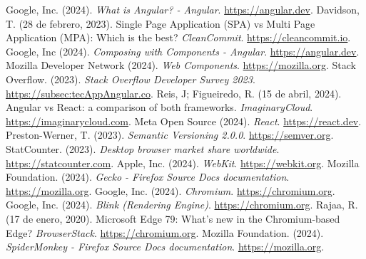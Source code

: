 \begin{thebibliography}{99}
     Google, Inc. (2024). \textit{What is Angular? - Angular}. \href{https://angular.dev/overview}{https://angular.dev}.
     Davidson, T. (28 de febrero, 2023). Single Page Application (SPA) vs Multi Page Application (MPA): Which is the best? \textit{CleanCommit}. \href{https://cleancommit.io/blog/spa-vs-mpa-which-is-the-king}{https://cleancommit.io}.
     Google, Inc (2024). \textit{Composing with Components - Angular}. \href{https://angular.dev/essentials/components}{https://angular.dev}.
     Mozilla Developer Network (2024). \textit{Web Components}. \href{https://developer.mozilla.org/en-US/docs/Web/API/Web_components}{https://mozilla.org}.
     Stack Overflow. (2023). \textit{Stack Overflow Developer Survey 2023}. \href{https://survey.subsec:tecAppAngular.co/2023}{https://subsec:tecAppAngular.co}.
     Reis, J; Figueiredo, R. (15 de abril, 2024). Angular vs React: a comparison of both frameworks. \textit{ImaginaryCloud}. \href{https://www.imaginarycloud.com/blog/angular-vs-react/}{https://imaginarycloud.com}.
     Meta Open Source (2024). \textit{React}. \href{https://react.dev}{https://react.dev}.
     Preston-Werner, T. (2023). \textit{Semantic Versioning 2.0.0}. \href{https://semver.org}{https://semver.org}.
     StatCounter. (2023). \textit{Desktop browser market share worldwide}. \href{https://gs.statcounter.com/browser-market-share/desktop/worldwide/2023}{https://statcounter.com}.
     Apple, Inc. (2024). \textit{WebKit}. \href{https://webkit.org}{https://webkit.org}.
     Mozilla Foundation. (2024). \textit{Gecko - Firefox Source Docs documentation}. \href{https://firefox-source-docs.mozilla.org/overview/gecko.html}{https://mozilla.org}.
     Google, Inc. (2024). \textit{Chromium}. \href{https://www.chromium.org/Home/}{https://chromium.org}.
     Google, Inc. (2024). \textit{Blink (Rendering Engine)}. \href{https://www.chromium.org/blink/}{https://chromium.org}.
     Rajaa, R. (17 de enero, 2020). Microsoft Edge 79: What's new in the Chromium-based Edge? \textit{BrowserStack}. \href{https://www.chromium.org/blink/}{https://chromium.org}.
     Mozilla Foundation. (2024). \textit{SpiderMonkey - Firefox Source Docs documentation}. \href{https://firefox-source-docs.mozilla.org/js/index.html}{https://mozilla.org}.

\end{thebibliography}

